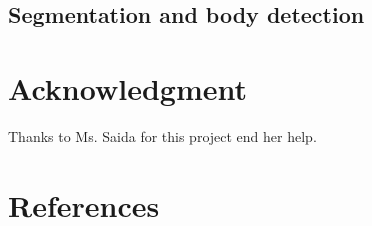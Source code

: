 \documentclass[conference]{IEEEtran}
\begin{document}
\subsection{Segmentation and body detection}

\section*{Acknowledgment}

Thanks to Ms. Saida for this project end her help.

\section*{References}



\vspace{12pt}
\color{red}
\end{document}

